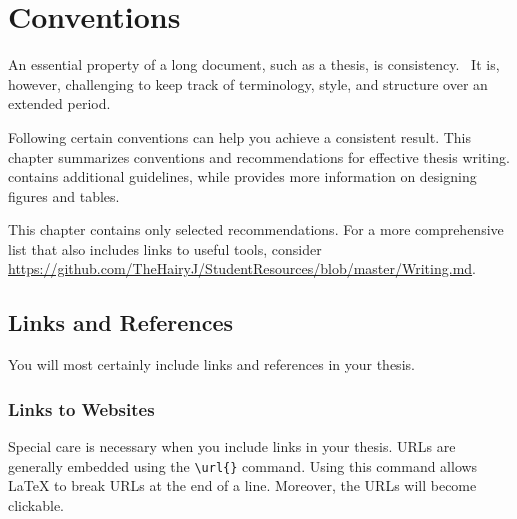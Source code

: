 \chapter{Conventions} %

\label{Chapter2} %


An essential property of a long document, such as a thesis, is consistency.%
\ 
It is, however, challenging to keep track of terminology, style, and structure over an extended period.

Following certain conventions can help you achieve a consistent result. This chapter summarizes conventions and recommendations for effective thesis writing.
\Cref{appendixa} contains additional guidelines, while \Cref{appendixb} provides more information on designing figures and tables.

This%
 chapter contains only selected recommendations. For a more comprehensive list that also includes links to useful tools, consider \url{https://github.com/TheHairyJ/StudentResources/blob/master/Writing.md}.

\section{Links and References}

You will most certainly include links and references in your thesis.

\subsection{Links to Websites}

Special care is necessary when you include links in your thesis. URLs are generally embedded using the \verb|\url{}| command. Using this command allows LaTeX to break URLs at the end of a line. Moreover, the URLs will become clickable.

